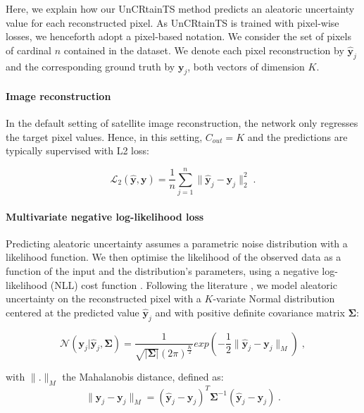\documentclass[10pt,twocolumn,letterpaper]{article}
\begin{document}
Here, we explain how our UnCRtainTS method predicts an aleatoric uncertainty value for each reconstructed pixel. As UnCRtainTS is trained with pixel-wise losses, we henceforth adopt a pixel-based notation. We consider the set of pixels of cardinal $n$ contained in the dataset. We denote each pixel reconstruction by $\boldsymbol{\hat{y}}_j$ and the corresponding ground truth by $\boldsymbol{y}_j$, both vectors of dimension $K$. 

\paragraph{\bf Image reconstruction} In the default setting of satellite image reconstruction, the network only regresses the target pixel values. Hence, in this setting, $C_{out}=K$ and the predictions are typically  supervised with L2 loss\cite{dong2015image,anwar2020deep}:

\begin{equation}
\mathcal{L}_2(\boldsymbol{\hat{y}},\boldsymbol{y}) = \frac{1}{n} \sum_{j=1}^{n} \|\boldsymbol{\hat{y}}_j - \boldsymbol{y}_j\|_2^2 \; .
\label{eq:L2}
\end{equation}


\paragraph{\bf Multivariate negative log-likelihood loss}
Predicting aleatoric uncertainty assumes a parametric noise distribution with a likelihood function. We then optimise the likelihood of the observed data as a function of the input and the distribution's parameters, using a negative log-likelihood (NLL) cost function \cite{bishop2006pattern}. Following the literature \cite{kendall2017uncertainties},  we model aleatoric uncertainty on the reconstructed pixel with a $K$-variate Normal distribution centered at the predicted value $\boldsymbol{\hat{y}}_j $ and with positive definite covariance matrix $\boldsymbol{\Sigma}$:


\begin{equation}
\mathcal{N}(\boldsymbol{y}_j|\boldsymbol{\hat{y}}_j, \boldsymbol{\Sigma}) = \frac{1}{\sqrt{|\boldsymbol{\Sigma|}}(2\pi)^\frac{K}{2}}  exp\left(-\frac{1}{2} \|\boldsymbol{\hat{y}}_j - \boldsymbol{y}_j \|_M \right) \;,
\label{eq:multi_Normal}
\end{equation}

with $\|.\|_M $ the Mahalanobis distance, defined as:
\begin{equation}
\|\boldsymbol{\hat{y}}_j - \boldsymbol{y}_j \|_M  = (\boldsymbol{\hat{y}}_j - \boldsymbol{y}_j )^T \boldsymbol{\Sigma}^{-1}(\boldsymbol{\hat{y}}_j - \boldsymbol{y}_j  ) \;.
\label{eq:Mahalanobis}
\end{equation}
\end{document}
